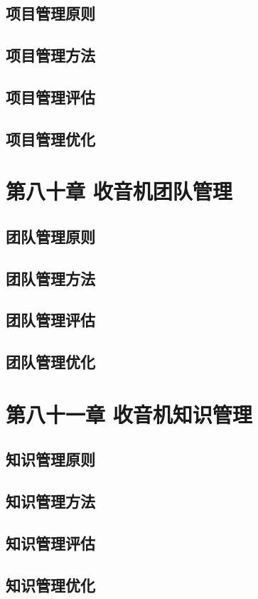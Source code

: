 \documentclass[12pt,UTF8]{ctexbook}
\begin{document}
\section{项目管理原则}
\section{项目管理方法}
\section{项目管理评估}
\section{项目管理优化}

\chapter{第八十章 收音机团队管理}

\section{团队管理原则}
\section{团队管理方法}
\section{团队管理评估}
\section{团队管理优化}

\chapter{第八十一章 收音机知识管理}

\section{知识管理原则}
\section{知识管理方法}
\section{知识管理评估}
\section{知识管理优化}
\end{document}
